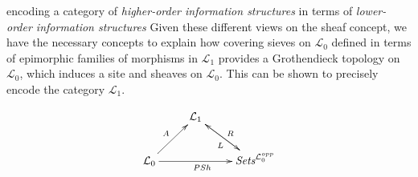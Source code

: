 \begin{frame}
\begin{block}{encoding a category of {\it higher-order information structures} in terms of {\it lower-order information structures}}
Given these different views on the sheaf concept, we have the necessary concepts to explain how covering sieves on $\mathcal{L}_0$ defined in terms of epimorphic families of morphisms in $\mathcal{L}_1$ provides a Grothendieck topology on $\mathcal{L}_0$, which induces a site and sheaves on $\mathcal{L}_0$. This can be shown to precisely encode the category $\mathcal{L}_1$.
\end{block}
\begin{block}{}
\begin{displaymath}
\xymatrix{
& \mathcal{L}_1 \ar[rd]^{R} & \\
\mathcal{L}_0 \ar[ru]^{A} \ar[rr]_{PSh} & & \textit{Sets}^{\mathcal{L}_0^{opp}} \ar[lu]^{L}
}
\end{displaymath}
\end{block}
\end{frame}